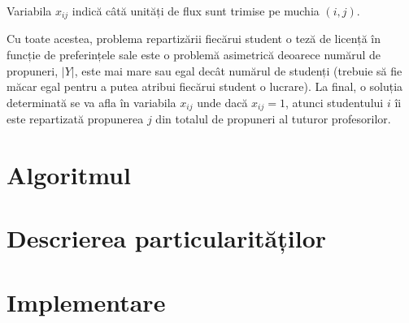 Variabila $x_{ij}$ indică câtă unități de flux sunt trimise pe muchia $(i, j)$.

Cu toate acestea, problema repartizării fiecărui student o teză de licență în funcție de preferințele sale este o problemă asimetrică deoarece numărul de propuneri, $|Y|$, este mai mare sau egal decât numărul de studenți (trebuie să fie măcar egal pentru a putea atribui fiecărui student o lucrare). La final, o soluția determinată se va afla în variabila $x_{ij}$ unde dacă $x_{ij} = 1$, atunci studentului $i$ îi este repartizată propunerea $j$ din totalul de propuneri al tuturor profesorilor.

\section{Algoritmul}

\section{Descrierea particularităților}


\section{Implementare}

